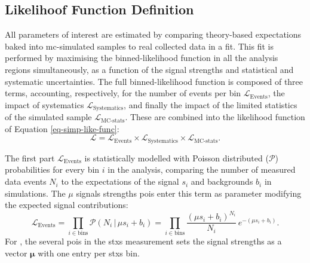 \subsection{Likelihoof Function Definition}\label{subsec-likelidef}
All parameters of interest are estimated by comparing theory-based expectations baked into \gls{mc}-simulated samples to real collected data in a fit. This fit is performed by maximising the binned-likelihood function in all the analysis regions simultaneously, as a function of the signal strengths and statistical and systematic uncertainties. The full binned-likelihood function is composed of three terms, accounting, respectively, for the number of events per bin $\mathcal{L}_{\text{Events}}$, the impact of systematics $\mathcal{L}_{\text{Systematics}}$, and finally the impact of the limited statistics of the simulated sample $\mathcal{L}_{\text{MC-stats}}$. These are combined into the likelihood function of Equation \ref{eq-simp-like-func}: 
\begin{equation}\label{eq-simp-like-func}
    \mathcal{L} = \mathcal{L}_{\text{Events}} \times \mathcal{L}_{\text{Systematics}} \times \mathcal{L}_{\text{MC-stats}}.
\end{equation}

The first part $\mathcal{L}_{\text{Events}}$ is statistically modelled with Poisson distributed ($\mathcal{P}$) probabilities for every bin $i$ in the analysis, comparing the number of measured data events $N_i$ to the expectations of the signal $s_i$ and backgrounds $b_i$ in simulations. The $\mu$ signals strengths \gls{poi}s enter this term as parameter modifying the expected signal contributions: \[\mathcal{L}_{\text{Events}} = \prod_{i\in \textrm{bins}} \mathcal{P}(N_i \,|\, \mu s_i + b_i) = \prod_{i\in \textrm{bins}} \frac{\left(\mu s_i + b_i\right)^{N_i}}{N_i} \, e^{-\left(\mu s_i + b_i\right)}.\] For \vhb, the several \gls{poi}s in the \gls{stxs} measurement sets the signal strengths as a vector $\boldsymbol{\mu}$ with one entry per \gls{stxs} bin.\\

